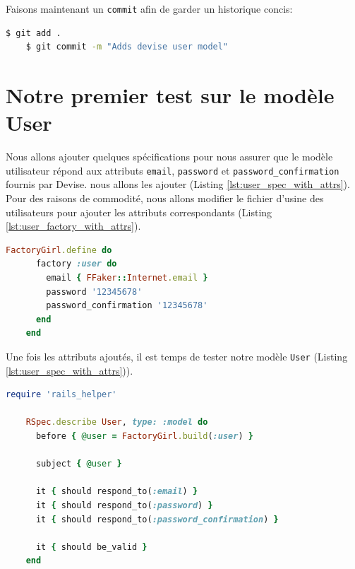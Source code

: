 \documentclass[]{report}
\begin{document}
    Faisons maintenant un \verb|commit| afin de garder un historique concis:

    \begin{scriptsize}
    \begin{lstlisting}[language=bash]
    $ git add .
    $ git commit -m "Adds devise user model"
    \end{lstlisting}
    \end{scriptsize}

  \section{Notre premier test sur le modèle User}

    Nous allons ajouter quelques spécifications pour nous assurer que le modèle utilisateur répond aux attributs \verb|email|, \verb|password| et \verb|password_confirmation| fournis par Devise. nous allons les ajouter (Listing \ref{lst:user_spec_with_attrs}). Pour des raisons de commodité, nous allons modifier le fichier d'usine des utilisateurs pour ajouter les attributs correspondants (Listing \ref{lst:user_factory_with_attrs}).

    \begin{scriptsize}
    \begin{lstlisting}[language=ruby, caption={Usine d'utilisateurs avec les attributs (spec/factories/users.rb)}, label={lst:user_factory_with_attrs}]
    FactoryGirl.define do
      factory :user do
        email { FFaker::Internet.email }
        password '12345678'
        password_confirmation '12345678'
      end
    end
    \end{lstlisting}
    \end{scriptsize}

    Une fois les attributs ajoutés, il est temps de tester notre modèle \verb|User| (Listing \ref{lst:user_spec_with_attrs})).

    \begin{scriptsize}
    \begin{lstlisting}[language=ruby, caption={Test pour les attributs Devise (spec/models/user_spec.rb)}, label={lst:user_spec_with_attrs}]
    require 'rails_helper'

    RSpec.describe User, type: :model do
      before { @user = FactoryGirl.build(:user) }

      subject { @user }

      it { should respond_to(:email) }
      it { should respond_to(:password) }
      it { should respond_to(:password_confirmation) }

      it { should be_valid }
    end
    \end{lstlisting}
    \end{scriptsize}
\end{document}
